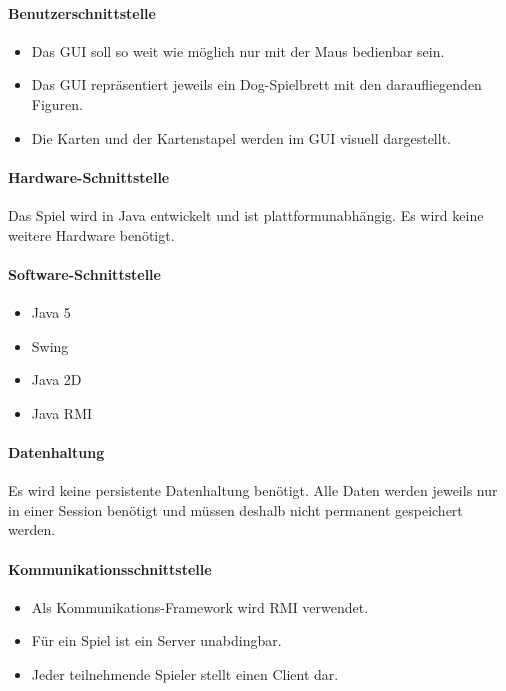 \documentclass[a4paper,12pt,halfparskip,DIV14]{scrartcl}
\begin{document}
\paragraph{Benutzerschnittstelle}\label{ssub:benutzerschnittstelle} %
\begin{itemize}
	\item Das GUI soll so weit wie möglich nur mit der Maus bedienbar sein.
	\item Das GUI repräsentiert jeweils ein Dog-Spielbrett mit den daraufliegenden Figuren.
	\item Die Karten und der Kartenstapel werden im GUI visuell dargestellt.
\end{itemize}
\paragraph{Hardware-Schnittstelle}\label{ssub:hardware_schnittstelle} %
Das Spiel wird in Java entwickelt und ist plattformunabhängig. Es wird keine weitere Hardware benötigt.
\paragraph{Software-Schnittstelle}\label{ssub:software_schnittstelle} %
\begin{itemize}
	\item Java 5
	\item Swing
	\item Java 2D
	\item Java RMI
\end{itemize}
\paragraph{Datenhaltung}\label{ssub:datenhaltung} %
Es wird keine persistente Datenhaltung benötigt. Alle Daten werden jeweils nur in einer Session benötigt und müssen deshalb nicht permanent gespeichert werden.
\paragraph{Kommunikationsschnittstelle}\label{ssub:kommunikationsschnittstelle} %
\begin{itemize}
	\item Als Kommunikations-Framework wird RMI verwendet.
	\item Für ein Spiel ist ein Server unabdingbar.
	\item Jeder teilnehmende Spieler stellt einen Client dar.
\end{itemize}
\end{document}
